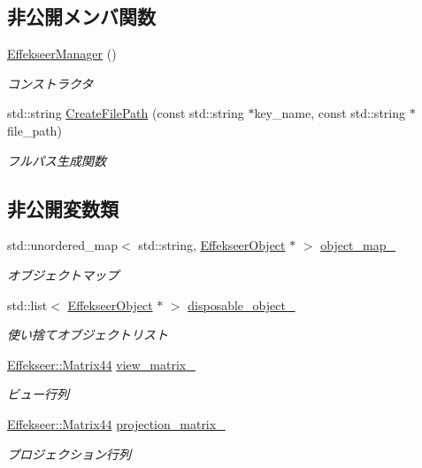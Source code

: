 \subsection*{非公開メンバ関数}
\begin{DoxyCompactItemize}
\item 
\mbox{\hyperlink{class_effekseer_manager_acdc424090c46bb80cb0a70bae7245c01}{Effekseer\+Manager}} ()
\begin{DoxyCompactList}\small\item\em コンストラクタ \end{DoxyCompactList}\item 
std\+::string \mbox{\hyperlink{class_effekseer_manager_af66d941d5d5ece091e2c34f30bc14629}{Create\+File\+Path}} (const std\+::string $\ast$key\+\_\+name, const std\+::string $\ast$file\+\_\+path)
\begin{DoxyCompactList}\small\item\em フルパス生成関数 \end{DoxyCompactList}\end{DoxyCompactItemize}
\subsection*{非公開変数類}
\begin{DoxyCompactItemize}
\item 
std\+::unordered\+\_\+map$<$ std\+::string, \mbox{\hyperlink{class_effekseer_object}{Effekseer\+Object}} $\ast$ $>$ \mbox{\hyperlink{class_effekseer_manager_a85e9a95a0b20c4b1b55c6796ed4b2d1c}{object\+\_\+map\+\_\+}}
\begin{DoxyCompactList}\small\item\em オブジェクトマップ \end{DoxyCompactList}\item 
std\+::list$<$ \mbox{\hyperlink{class_effekseer_object}{Effekseer\+Object}} $\ast$ $>$ \mbox{\hyperlink{class_effekseer_manager_ad331be04d762bbc7619999a0947c306a}{disposable\+\_\+object\+\_\+}}
\begin{DoxyCompactList}\small\item\em 使い捨てオブジェクトリスト \end{DoxyCompactList}\item 
\mbox{\hyperlink{struct_effekseer_1_1_matrix44}{Effekseer\+::\+Matrix44}} \mbox{\hyperlink{class_effekseer_manager_a0ea3c32637818a3fab28fb7d17a03970}{view\+\_\+matrix\+\_\+}}
\begin{DoxyCompactList}\small\item\em ビュー行列 \end{DoxyCompactList}\item 
\mbox{\hyperlink{struct_effekseer_1_1_matrix44}{Effekseer\+::\+Matrix44}} \mbox{\hyperlink{class_effekseer_manager_a04d1e978c13b53e668ac3c56c6a92b3a}{projection\+\_\+matrix\+\_\+}}
\begin{DoxyCompactList}\small\item\em プロジェクション行列 \end{DoxyCompactList}\end{DoxyCompactItemize}

